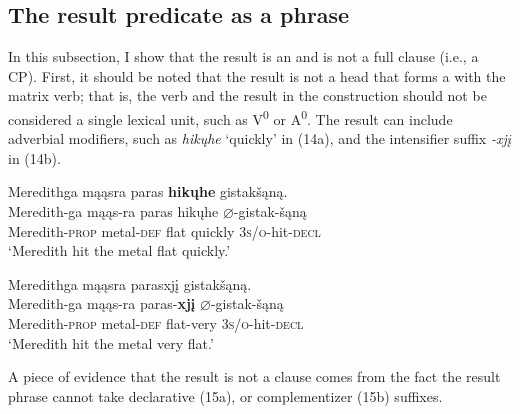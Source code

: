\documentclass[output=paper]{LSP/langsci}
\begin{document}
\subsection{The result predicate as a phrase}\label{sec:rosen:3.1}

In this subsection, I show that the result is an  and is not a full clause (i.e., a CP). First, it should be noted that the result is not a head that forms a  with the matrix verb; that is, the verb and the result in the construction should not be considered a single lexical unit, such as V\textsuperscript{0} or A\textsuperscript{0}. The result can include adverbial modifiers, such as \textit{hikųhe} `quickly' in (14a), and the intensifier suffix \textit{-xjį} in (14b).

\begin{exe}
\ex\label{ex:rosen:14}
\begin{xlist}

\ex \glll Meredithga mąąsra paras \textbf{hikųhe} gistakšąną. \\
 Meredith-ga mąąs-ra paras hikųhe {$\varnothing$}-gistak-šąną\\
Meredith-\textsc{prop} metal-\textsc{def} flat quickly \textsc{3s/o}-hit-\textsc{decl}\\ 
\glt `Meredith hit the metal flat quickly.'


\ex \glll Meredithga mąąsra parasxjį gistakšąną.\\
 Meredith-ga mąąs-ra paras-\textbf{xjį} {$\varnothing$}-gistak-šąną\\
Meredith-\textsc{prop} metal-\textsc{def} flat-very  \textsc{3s/o}-hit-\textsc{decl}\\
\glt `Meredith hit the metal very flat.'

\end{xlist}
\end{exe}

A piece of evidence that the result  is not a clause comes from the fact the result phrase cannot take declarative (15a), or complementizer (15b) suffixes.

\begin{exe}
\ex\label{ex:rosen:15}
\begin{xlist}



\end{xlist}
\end{exe}
\end{document}
